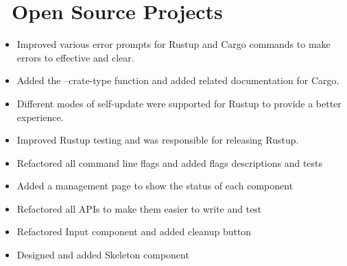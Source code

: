 \documentclass{resume}
\newcommand{\en}[1]{#1}
\newcommand{\zh}[1]{}
\begin{document}
\section{\faGithubAlt\ \en{Open Source Projects}\zh{开源项目}}
\en{}
\zh{\role{活跃维护者}{\href{https://github.com/search?q=repo:rust-lang/cargo+repo:rust-lang/rustup++author:hi-rustin&type=commits}{260+ 个提交}}}
\begin{itemize}
      \item \en{Improved various error prompts for Rustup and Cargo commands to make errors to effective and clear.}
            \zh{改善了大量 Rustup 和 Cargo 命令的错误提示，让错误更有效更清晰。}
      \item \en{Added the --crate-type function and added related documentation for Cargo.}
            \zh{为 Cargo 添加了 --crate-type 功能和相关文档。}
      \item \en{Different modes of self-update were supported for Rustup to provide a better experience.}
            \zh{为 Rustup 支持了 self-update 的不同模式来提供更好的使用体验。}
      \item \en{Improved Rustup testing and was responsible for releasing Rustup.}
            \zh{改善 Rustup 测试，负责发布 Rustup。}
\end{itemize}

\en{}
\zh{\role{活跃贡献者}{\href{https://github.com/grafana/phlare/commits?author=hi-rustin}{28+ 个提交}}}
\begin{itemize}
      \item \en{Refactored all command line flags and added flags descriptions and tests}
            \zh{重构了所有命令行参数，并添加了参数说明和测试}
      \item \en{Added a management page to show the status of each component}
            \zh{添加了管理页面展示各组件状态}
      \item \en{Refactored all APIs to make them easier to write and test}
            \zh{重构了所有 API 使其更容易编写和测试}
\end{itemize}

\en{}
\zh{\role{前维护者}{\href{https://github.com/ant-design/ant-design/commits?author=hi-rustin}{24+ 个提交}}}
\begin{itemize}
      \item \en{Refactored Input component and added cleanup button}
            \zh{重构了 Input 组件，添加清理按钮}
      \item \en{Designed and added Skeleton component}
            \zh{设计并添加了 Skeleton 组件}
\end{itemize}
\end{document}
